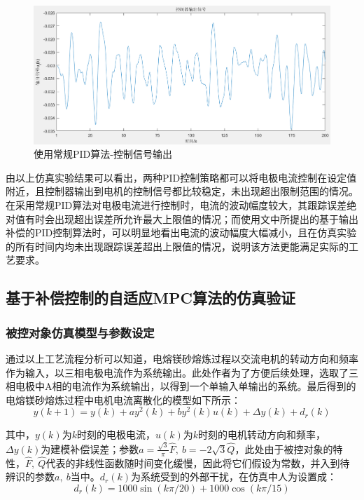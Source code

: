 \documentclass[UTF8, 12pt]{article}
\begin{document}
\begin{figure}[H]
    \centering %
    \includegraphics[width=.8\textwidth]{figure/常规PID-控制信号.png} 
    \caption{使用常规PID算法-控制信号输出} %
\end{figure}

由以上仿真实验结果可以看出，两种PID控制策略都可以将电极电流控制在设定值附近，且控制器输出到电机的控制信号都比较稳定，未出现超出限制范围的情况。在采用常规PID算法对电极电流进行控制时，电流的波动幅度较大，其跟踪误差绝对值有时会出现超出误差所允许最大上限值的情况；而使用文中所提出的基于输出补偿的PID控制算法时，可以明显地看出电流的波动幅度大幅减小，且在仿真实验的所有时间内均未出现跟踪误差超出上限值的情况，说明该方法更能满足实际的工艺要求。


\subsection{基于补偿控制的自适应MPC算法的仿真验证}
\subsubsection{被控对象仿真模型与参数设定}
通过以上工艺流程分析可以知道，电熔镁砂熔炼过程以交流电机的转动方向和频率作为输入，以三相电极电流作为系统输出。此处作者为了方便后续处理，选取了三相电极中A相的电流作为系统输出，以得到一个单输入单输出的系统。最后得到的电熔镁砂熔炼过程中电机电流离散化的模型如下所示：
\begin{equation*}
	y(k+1) = y(k) + ay^2(k) + by^2(k)u(k) + \Delta y(k) + d_r(k)
\end{equation*}

其中，$y(k)$为$k$时刻的电极电流，$u(k)$为$k$时刻的电机转动方向和频率，$\Delta y(k)$为建模补偿误差；参数$a = \frac{\sqrt{3}}{\pi}\hat{F},\ b = -2\sqrt{3}\hat{Q}$，此处由于被控对象的特性，$\hat{F},\ \hat{Q}$代表的非线性函数随时间变化缓慢，因此将它们假设为常数，并入到待辨识的参数$a,\ b$当中。$d_r(k)$为系统受到的外部干扰，在仿真中人为设置成：
\begin{equation*}
	d_r(k) = 1000\sin(k\pi/20) + 1000\cos(k\pi/15)
\end{equation*}
\end{document}
